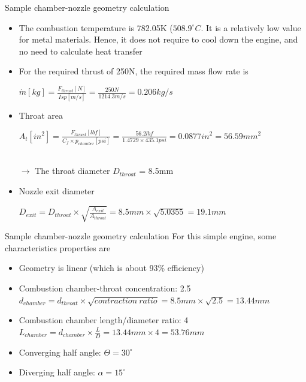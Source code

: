 \documentclass{beamer}
\begin{document}
\begin{frame}{Sample chamber-nozzle geometry calculation}
\begin{itemize}
    \setlength\itemsep{0.5em}
    \item The combustion temperature is 782.05K ($508.9^{\circ}C$. It is a relatively low value for metal materials. Hence, it does not require to cool down the engine, and no need to calculate heat transfer
    \item For the required thrust of 250N, the required mass flow rate is
    \begin{center}
        $\dot{m}[kg] = \frac{F_{thrust}[N]}{Isp[m/s]} = \frac{250N}{1214.3m/s} = 0.206kg/s$ 
    \end{center}
    \item Throat area
    \begin{center}
        $A_t[in^2] = \frac{F_{thrust}[lbf]}{C_f \times p_{chamber}[psi]} = \frac{56.2lbf}{1.4729 \times 435.1psi} = 0.0877in^2 = 56.59mm^2$
    \end{center} \\
    $\rightarrow$ The throat diameter $D_{throat}$ = 8.5mm
    \item Nozzle exit diameter
    \begin{center}
        $D_{exit} = D_{throat} \times \sqrt{\frac{A_{exit}}{A_{throat}}} = 8.5mm \times \sqrt{5.0355} = 19.1mm$
    \end{center}
\end{itemize}
\end{frame}

\begin{frame}{Sample chamber-nozzle geometry calculation}
    For this simple engine, some characteristics properties are
    \begin{itemize}
        \item Geometry is linear (which is about 93\% efficiency)
        \item Combustion chamber-throat concentration: 2.5 \\
        $d_{chamber} = d_{throat} \times \sqrt{{contraction\:ratio}} = 8.5mm \times \sqrt{2.5} = 13.44mm$
        \item Combustion chamber length/diameter ratio: 4
        $L_{chamber} = d_{chamber} \times \frac{L}{D} = 13.44mm \times 4 = 53.76mm$
        \item Converging half angle: $\Theta = 30^{\circ}$
        \item Diverging half angle: $\alpha = 15^{\circ}$
    \end{itemize}
\end{frame}
\end{document}
